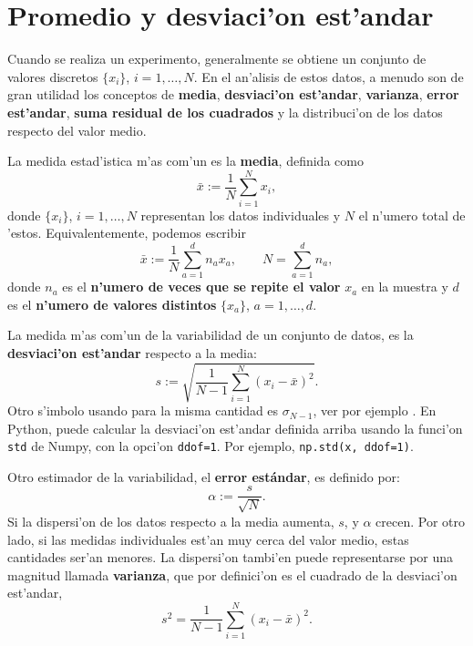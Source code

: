 \section{Promedio y desviaci'on est'andar}

Cuando se realiza un experimento, generalmente se obtiene un conjunto de valores discretos $\lbrace x_i\rbrace$, $i=1,\dots,N$.  En el an'alisis de estos datos, a menudo son de gran utilidad los conceptos de \textbf{media}, \textbf{desviaci'on est'andar}, \textbf{varianza}, \textbf{error est'andar}, \textbf{suma residual de los cuadrados}  y la distribuci'on de los datos respecto del valor medio. 

La medida estad'istica m'as com'un es la \textbf{media}, definida como
\begin{equation}
\bar{x}:=\frac{1}{N}\sum_{i=1}^N x_i,
\end{equation}
donde $\lbrace x_i\rbrace$, $i=1,\dots,N$ representan los datos individuales y $N$ el n'umero total de 'estos.
Equivalentemente, podemos escribir
\begin{equation}
\bar{x}:=\frac{1}{N}\sum_{a=1}^{d} n_a x_a, \qquad N=\sum_{a=1}^{d} n_a,
\end{equation}
donde $n_a$ es el \textbf{n'umero de veces que se repite el valor} $x_a$ en la muestra y $d$ es el \textbf{n'umero de valores distintos} $\lbrace x_a\rbrace$, $a=1,\dots,d$.
%
%
%

La medida m'as com'un de la variabilidad de un conjunto de datos, es la \textbf{desviaci'on est'andar} respecto a la media:
\begin{equation}
s:=\sqrt{\frac{1}{N-1}\sum_{i=1}^N(x_i-\bar{x})^2}.
\end{equation}
Otro s'imbolo usando para la misma cantidad es $\sigma_{N-1}$, ver por ejemplo \cite{HH2010}. En Python, puede calcular la desviaci'on est'andar definida arriba usando la funci'on \texttt{std} de Numpy, con la opci'on \texttt{ddof=1}. Por ejemplo, \texttt{np.std(x, ddof=1)}.

Otro estimador de la variabilidad, el \textbf{error estándar}, es definido por:
\begin{equation}
\alpha:=\frac{s}{\sqrt{N}}.
\end{equation}
Si la dispersi'on de los datos respecto a la media aumenta, $s$, y $\alpha$ crecen. Por otro lado, si las medidas individuales est'an muy cerca del valor medio, estas cantidades ser'an menores. La dispersi'on tambi'en puede representarse por una magnitud llamada \textbf{varianza}, que por definici'on es el cuadrado de la desviaci'on est'andar,
\begin{equation}
s^2=\frac{1}{N-1}\sum_{i=1}^N(x_i-\bar{x})^2.
\end{equation}

